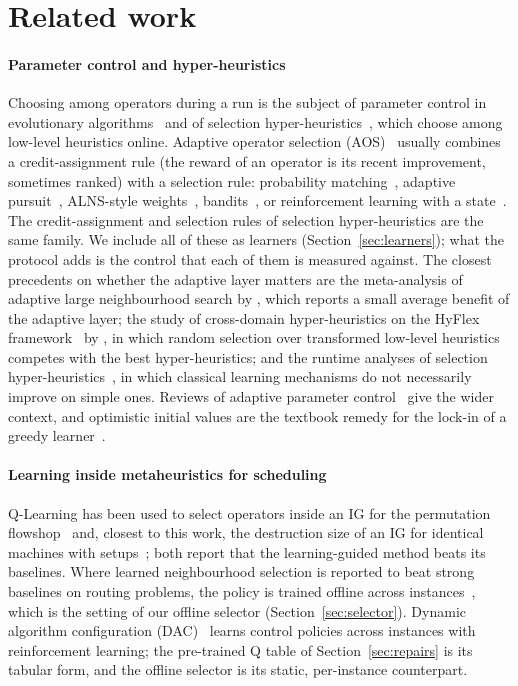 \section{Related work}
\label{sec:related}

\paragraph{Parameter control and hyper-heuristics} Choosing among operators during a run is the subject of parameter control in evolutionary algorithms~\cite{EibenEtal1999,KarafotiasEtal2015} and of selection hyper-heuristics~\cite{BurkeEtal2013,DrakeEtal2020}, which choose among low-level heuristics online. Adaptive operator selection (AOS)~\cite{FialhoEtal2010} usually combines a credit-assignment rule (the reward of an operator is its recent improvement, sometimes ranked) with a selection rule: probability matching~\cite{Goldberg1990}, adaptive pursuit~\cite{Thierens2005}, ALNS-style weights~\cite{PisingerRopke2007}, bandits~\cite{AuerEtal2002,DaCostaEtal2008}, or reinforcement learning with a state~\cite{BengioBengio2021}. The credit-assignment and selection rules of selection hyper-heuristics are the same family. We include all of these as learners (Section~\ref{sec:learners}); what the protocol adds is the control that each of them is measured against. The closest precedents on whether the adaptive layer matters are the meta-analysis of adaptive large neighbourhood search by \citet{TurkesEtal2021}, which reports a small average benefit of the adaptive layer; the study of cross-domain hyper-heuristics on the HyFlex framework~\cite{OchoaEtal2012} by \citet{SobotkaEtal2025}, in which random selection over transformed low-level heuristics competes with the best hyper-heuristics; and the runtime analyses of selection hyper-heuristics~\cite{AlanaziLehre2014}, in which classical learning mechanisms do not necessarily improve on simple ones. Reviews of adaptive parameter control~\cite{AletiMoser2016} give the wider context, and optimistic initial values are the textbook remedy for the lock-in of a greedy learner~\cite{SuttonBarto2018,RashidEtal2020}.

\paragraph{Learning inside metaheuristics for scheduling} Q-Learning has been used to select operators inside an IG for the permutation flowshop~\cite{KarimiMamaghanEtal2023} and, closest to this work, the destruction size of an IG for identical machines with setups~\cite{MissaouiOSullivan2026}; both report that the learning-guided method beats its baselines. Where learned neighbourhood selection is reported to beat strong baselines on routing problems, the policy is trained offline across instances~\cite{SonneratEtal2021}, which is the setting of our offline selector (Section~\ref{sec:selector}). Dynamic algorithm configuration (DAC)~\cite{BiedenkappEtal2020,EimerEtal2021} learns control policies across instances with reinforcement learning; the pre-trained Q table of Section~\ref{sec:repairs} is its tabular form, and the offline selector is its static, per-instance counterpart.

